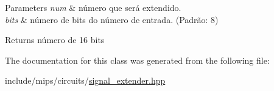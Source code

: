 \begin{DoxyParams}{Parameters}
{\em num} & número que será extendido. \\
\hline
{\em bits} & número de bits do número de entrada. (Padrão\+: 8) \\
\hline
\end{DoxyParams}
\begin{DoxyReturn}{Returns}
número de 16 bits 
\end{DoxyReturn}


The documentation for this class was generated from the following file\+:\begin{DoxyCompactItemize}
\item 
include/mips/circuits/\hyperlink{signal__extender_8hpp}{signal\+\_\+extender.\+hpp}\end{DoxyCompactItemize}
